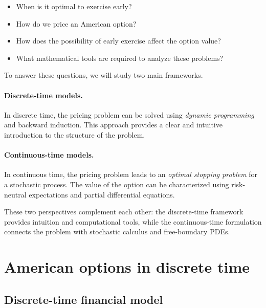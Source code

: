 \documentclass[11pt]{article}
\theoremstyle{definition}
\theoremstyle{plain}
\begin{document}
\begin{itemize}[leftmargin=1.4em]
\item When is it optimal to exercise early?

\item How do we price an American option?

\item How does the possibility of early exercise affect the option value?

\item What mathematical tools are required to analyze these problems?
\end{itemize}

\vspace{0.5em}

\noindent
To answer these questions, we will study two main frameworks.

\paragraph{Discrete-time models.}
In discrete time, the pricing problem can be solved using
\emph{dynamic programming} and backward induction.
This approach provides a clear and intuitive introduction to the
structure of the problem.

\paragraph{Continuous-time models.}
In continuous time, the pricing problem leads to an
\emph{optimal stopping problem} for a stochastic process.
The value of the option can be characterized using
risk-neutral expectations and partial differential equations.

These two perspectives complement each other:
the discrete-time framework provides intuition and computational tools,
while the continuous-time formulation connects the problem with
stochastic calculus and free-boundary PDEs.

\section{American options in discrete time}

\subsection{Discrete-time financial model}
\end{document}
